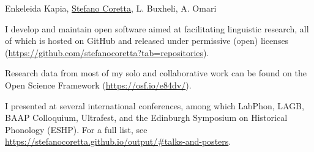 \documentclass[9pt]{developercv} %
\begin{document}

\begin{entrylist}
		{}
		{\small Enkeleida Kapia, \underline{Stefano Coretta}, L. Buxheli, A. Omari}
\end{entrylist}



\begin{entrylist}
	\entry
		{\hspace{1em}}
		{\textnormal{I develop and maintain open software aimed at facilitating linguistic research, all of which is hosted on GitHub and released under permissive (open) licenses (\url{https://github.com/stefanocoretta?tab=repositories}).}}
		{}
		{}
\end{entrylist}



\begin{entrylist}
	\entry
		{\hspace{1em}}
		{\textnormal{Research data from most of my solo and collaborative work can be found on the Open Science Framework (\url{https://osf.io/e84dv/}).}}
		{}
		{}
\end{entrylist}



\begin{entrylist}
	\entry
		{\hspace{1em}}
		{\textnormal{I presented at several international conferences, among which LabPhon, LAGB, BAAP Colloquium, Ultrafest, and the Edinburgh Symposium on Historical Phonology (ESHP). For a full list, see \url{https://stefanocoretta.github.io/output/\#talks-and-posters}.}}
		{}
		{}
\end{entrylist}
\end{document}
